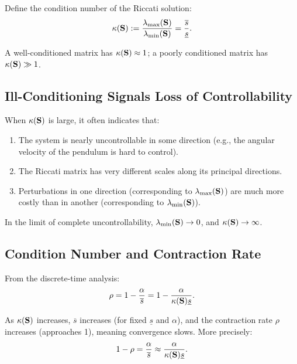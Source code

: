 Define the condition number of the Riccati solution:
\begin{equation}
\kappa(\mathbf{S}) := \frac{\lambda_{\max}(\mathbf{S})}{\lambda_{\min}(\mathbf{S})} = \frac{\overline{s}}{\underline{s}}.
\label{eq:ch6:kappa-S}
\end{equation}

A well-conditioned matrix has $\kappa(\mathbf{S}) \approx 1$; a poorly conditioned matrix has $\kappa(\mathbf{S}) \gg 1$.

\subsection{Ill-Conditioning Signals Loss of Controllability}

When $\kappa(\mathbf{S})$ is large, it often indicates that:
\begin{enumerate}
\item The system is nearly uncontrollable in some direction (e.g., the angular velocity of the pendulum is hard to control).
\item The Riccati matrix has very different scales along its principal directions.
\item Perturbations in one direction (corresponding to $\lambda_{\max}(\mathbf{S})$) are much more costly than in another
      (corresponding to $\lambda_{\min}(\mathbf{S})$).
\end{enumerate}

In the limit of complete uncontrollability, $\lambda_{\min}(\mathbf{S}) \to 0$, and $\kappa(\mathbf{S}) \to \infty$.

\subsection{Condition Number and Contraction Rate}

From the discrete-time analysis:
\begin{equation}
\rho = 1 - \frac{\alpha}{\overline{s}} = 1 - \frac{\alpha}{\kappa(\mathbf{S})\underline{s}}.
\label{eq:ch6:rho-vs-kappa}
\end{equation}

As $\kappa(\mathbf{S})$ increases, $\overline{s}$ increases (for fixed $\underline{s}$ and $\alpha$), and the contraction rate $\rho$ increases
(approaches 1), meaning convergence slows. More precisely:
\begin{equation}
1 - \rho = \frac{\alpha}{\overline{s}} \approx \frac{\alpha}{\kappa(\mathbf{S})\underline{s}}.
\label{eq:ch6:contraction-loss}
\end{equation}

